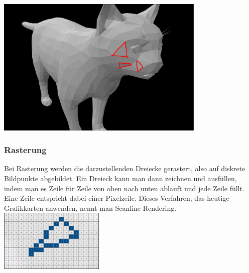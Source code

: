 \documentclass{beamer}
\begin{document}
\begin{frame}
	\frametitle{\phantom{}}
	\vspace{0.5cm}
	\centering
	\includegraphics[width=10cm]{bilder/cat.png}
\end{frame}


\begin{frame}
	\frametitle{Rasterung}
		\vspace{0.5cm}
		\textmd{\small Bei Rasterung werden die darzustellenden Dreiecke gerastert, also auf diskrete Bildpunkte abgebildet. Ein Dreieck kann man dann zeichnen und ausfüllen, indem man es Zeile für Zeile von oben nach unten abläuft und jede Zeile füllt. Eine Zeile entspricht dabei einer Pixelzeile. Dieses Verfahren, das heutige Grafikkarten anwenden, nennt man Scanline Rendering.} \\
		\vspace{0.3cm} %
		\centering
		\includegraphics[width=5cm]{bilder/scan-.png}
\end{frame}
\end{document}
